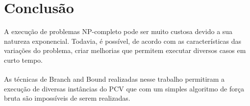 \documentclass[a4paper, 12pt]{article}
\begin{document}
\section{Conclusão}
\paragraph{}
A execução de problemas NP-completo pode ser muito custosa devido a sua natureza exponencial. Todavia, é possível, de acordo com as características das variações do problema, criar melhorias que permitem executar diversos casos em curto tempo. 
\paragraph{}
As técnicas de Branch and Bound realizadas nesse trabalho permitiram a execução de diversas instâncias do PCV que com um simples algoritmo de força bruta são impossíveis de serem realizadas.
\end{document}
